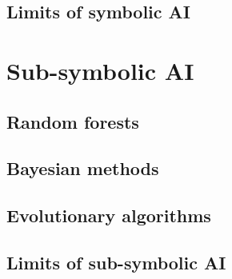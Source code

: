 \subsection{Limits of symbolic \Gls{AI}}\label{subsec:limits-of-symbolic-ai}

\section{Sub-symbolic \Gls{AI}}\label{sec:sub-symbolic-ai}

\subsection{Random forests}\label{subsec:random-forests}

\subsection{Bayesian methods}\label{subsec:bayesian-methods}

\subsection{Evolutionary algorithms}\label{subsec:evolutionary-algorithms}

\subsection{}\label{subsec:svm}

\subsection{}\label{subsec:neural-networks}

\subsection{Limits of sub-symbolic \Gls{AI}}\label{subsec:limits-of-sub-symbolic-ai}